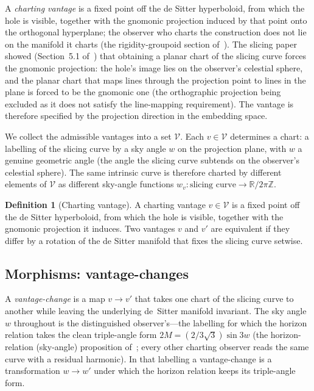 \documentclass[11pt,a4paper]{article}
\theoremstyle{definition}
\newtheorem{definition}[theorem]{Definition}
\begin{document}
A \emph{charting vantage} is a fixed point off the de Sitter hyperboloid, from which the hole is visible, together with the gnomonic projection induced by that point onto the orthogonal hyperplane; the observer who charts the construction does not lie on the manifold it charts (the rigidity-groupoid section of~\cite{JanzenSlicing}). The slicing paper showed (Section~5.1 of~\cite{JanzenSlicing}) that obtaining a planar chart of the slicing curve forces the gnomonic projection: the hole's image lies on the observer's celestial sphere, and the planar chart that maps lines through the projection point to lines in the plane is forced to be the gnomonic one (the orthographic projection being excluded as it does not satisfy the line-mapping requirement). The vantage is therefore specified by the projection direction in the embedding space.

We collect the admissible vantages into a set $\mathcal{V}$. Each $v\in\mathcal{V}$ determines a chart: a labelling of the slicing curve by a sky angle $w$ on the projection plane, with $w$ a genuine geometric angle (the angle the slicing curve subtends on the observer's celestial sphere). The same intrinsic curve is therefore charted by different elements of $\mathcal{V}$ as different sky-angle functions $w_{v}: \text{slicing curve}\to\mathbb{R}/2\pi\mathbb{Z}$.

\begin{definition}[Charting vantage]\label{def:vantage}
A charting vantage $v\in\mathcal{V}$ is a fixed point off the de Sitter hyperboloid, from which the hole is visible, together with the gnomonic projection it induces. Two vantages $v$ and $v'$ are equivalent if they differ by a rotation of the de Sitter manifold that fixes the slicing curve setwise.
\end{definition}

\subsection{Morphisms: vantage-changes}\label{sec:morphisms}

A \emph{vantage-change} is a map $v\to v'$ that takes one chart of the slicing curve to another while leaving the underlying de~Sitter manifold invariant. The sky angle $w$ throughout is the distinguished observer's---the labelling for which the horizon relation takes the clean triple-angle form $2M=(2/3\sqrt{3})\sin 3w$ (the horizon-relation (sky-angle) proposition of~\cite{JanzenSlicing}; every other charting observer reads the same curve with a residual harmonic). In that labelling a vantage-change is a transformation $w\to w'$ under which the horizon relation keeps its triple-angle form.
\end{document}
